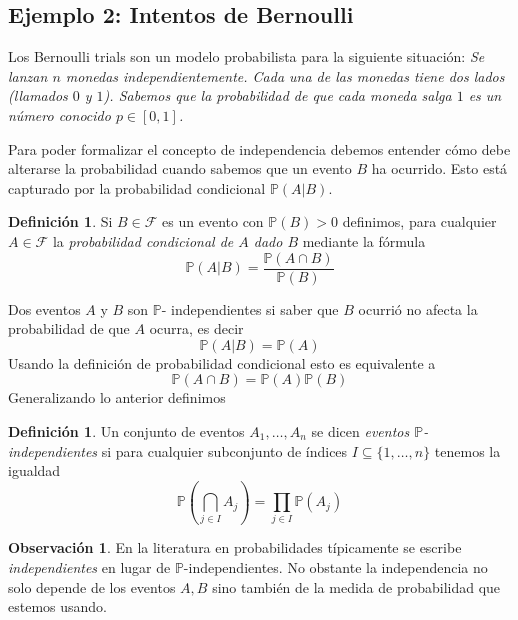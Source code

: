\documentclass[12pt]{amsart}
\theoremstyle{definition}
\newtheorem{definition}[lemma]{Definición}
\newtheorem{remark}[lemma]{Observación}
\newcommand{\PP}{\ensuremath{\mathbb{P}}}
\newcommand{\calF}{\ensuremath{\mathcal{F}}}
\begin{document}
\subsection{Ejemplo 2: Intentos de Bernoulli}

Los Bernoulli trials son un modelo probabilista para la siguiente situación: \emph{Se lanzan $n$ monedas independientemente. Cada una de las monedas tiene dos lados (llamados $0$ y $1$). Sabemos que la probabilidad de que cada moneda salga $1$ es un número conocido $p\in [0,1]$.}


Para poder formalizar el concepto de independencia debemos entender cómo debe alterarse la probabilidad cuando sabemos que un evento $B$ ha ocurrido. Esto está capturado por la probabilidad condicional $\PP(A|B)$.

\begin{definition} Si $B\in \calF$ es un evento con $\PP(B)>0$ definimos, para cualquier $A\in \calF$ la \emph{probabilidad condicional de $A$ dado $B$} mediante la fórmula
\[\PP\left(A|B\right)=\frac{\PP\left(A\cap B\right)}{\PP\left(B\right)}\]
\end{definition}

Dos eventos $A$ y $B$ son $\PP$- independientes si saber que $B$ ocurrió no afecta la probabilidad de que $A$ ocurra, es decir
\[\PP(A|B)=\PP(A)\] 
Usando la definición de probabilidad condicional esto es equivalente a
\[\PP(A\cap B)=\PP(A)\PP(B)\] 
Generalizando lo anterior definimos

\begin{definition} Un conjunto de eventos $A_1,\dots, A_n$ se dicen \emph{eventos $\PP$-independientes} si para cualquier subconjunto de índices $I\subseteq \{1,\dots, n\}$ tenemos la igualdad
\[\PP\left(\bigcap_{j\in I} A_j\right)=\prod_{j\in I} \PP(A_j)\]
\end{definition}
\begin{remark} En la literatura en probabilidades típicamente se escribe \emph{independientes} en lugar de $\PP$-independientes. No obstante la independencia no solo depende de los eventos $A,B$ sino también de la medida de probabilidad que estemos usando.
\end{remark}
\end{document}

